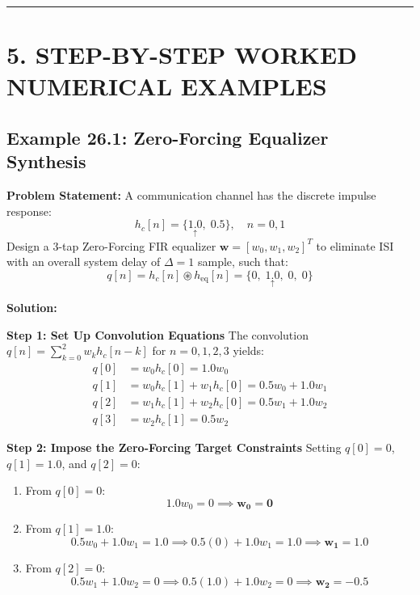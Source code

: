\documentclass[11pt,a4paper]{article}
\begin{document}
\noindent\rule{\textwidth}{0.5pt}

\section{5. STEP-BY-STEP WORKED NUMERICAL EXAMPLES}

\subsection{Example 26.1: Zero-Forcing Equalizer Synthesis}
\textbf{Problem Statement:} A communication channel has the discrete impulse response:
\begin{equation}
h_c[n] = \{ \underset{\uparrow}{1.0}, \; 0.5 \}, \quad n = 0, 1
\end{equation}
Design a 3-tap Zero-Forcing FIR equalizer $\mathbf{w} = [w_0, w_1, w_2]^T$ to eliminate ISI with an overall system delay of $\Delta = 1$ sample, such that:
\begin{equation}
q[n] = h_c[n] \circledast h_{\text{eq}}[n] = \{0, \; \underset{\uparrow}{1.0}, \; 0, \; 0\}
\end{equation}

\vspace{1mm}
\noindent\textbf{Solution:}

\noindent\textbf{Step 1: Set Up Convolution Equations}
The convolution $q[n] = \sum_{k=0}^2 w_k h_c[n-k]$ for $n = 0, 1, 2, 3$ yields:
\begin{align}
q[0] &= w_0 h_c[0] = 1.0 w_0 \\
q[1] &= w_0 h_c[1] + w_1 h_c[0] = 0.5 w_0 + 1.0 w_1 \\
q[2] &= w_1 h_c[1] + w_2 h_c[0] = 0.5 w_1 + 1.0 w_2 \\
q[3] &= w_2 h_c[1] = 0.5 w_2
\end{align}

\noindent\textbf{Step 2: Impose the Zero-Forcing Target Constraints}
Setting $q[0] = 0$, $q[1] = 1.0$, and $q[2] = 0$:
\begin{enumerate}
    \item From $q[0] = 0$:
    \begin{equation}
    1.0 w_0 = 0 \implies \mathbf{w_0 = 0}
    \end{equation}
    \item From $q[1] = 1.0$:
    \begin{equation}
    0.5 w_0 + 1.0 w_1 = 1.0 \implies 0.5(0) + 1.0 w_1 = 1.0 \implies \mathbf{w_1 = 1.0}
    \end{equation}
    \item From $q[2] = 0$:
    \begin{equation}
    0.5 w_1 + 1.0 w_2 = 0 \implies 0.5(1.0) + 1.0 w_2 = 0 \implies \mathbf{w_2 = -0.5}
    \end{equation}
\end{enumerate}
\end{document}
